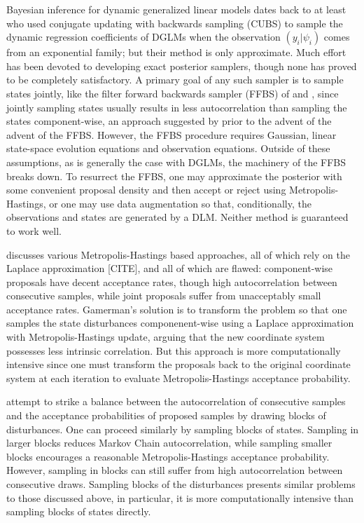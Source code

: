 \documentclass[11pt]{article}
\begin{document}
Bayesian inference for dynamic generalized linear models dates back to at least
\cite{west-etal-1985} who used conjugate updating with backwards sampling (CUBS)
to sample the dynamic regression coefficients of DGLMs when the observation
$(y_i | \psi_i)$ comes from an exponential family; but their method is only
approximate.  Much effort has been devoted to developing exact posterior
samplers, though none has proved to be completely satisfactory.  A primary goal
of any such sampler is to sample states jointly, like the filter forward
backwards sampler (FFBS) of \cite{fruhwirth-schnatter-1994} and
\cite{carter-kohn-1994}, since jointly sampling states usually results in less
autocorrelation than sampling the states component-wise, an approach suggested
by \cite{carlin-etal-1992} prior to the advent of the advent of the FFBS.
However, the FFBS procedure requires Gaussian, linear state-space evolution
equations and observation equations.  Outside of these assumptions, as is
generally the case with DGLMs, the machinery of the FFBS breaks down.  To
resurrect the FFBS, one may approximate the posterior with some convenient
proposal density and then accept or reject using Metropolis-Hastings, or one may
use data augmentation so that, conditionally, the observations and states are
generated by a DLM.  Neither method is guaranteed to work well.

\cite{gamerman-1998} discusses various Metropolis-Hastings based approaches, all
of which rely on the Laplace approximation [CITE], and all of which are
flawed: component-wise proposals have decent acceptance rates, though
high autocorrelation between consecutive samples, while joint proposals suffer
from unacceptably small acceptance rates.  Gamerman's solution is to transform
the problem so that one samples the state disturbances componenent-wise using a
Laplace approximation with Metropolis-Hastings update, arguing that the new
coordinate system possesses less intrinsic correlation.  But this approach is
more computationally intensive since one must transform the proposals back to
the original coordinate system at each iteration to evaluate Metropolis-Hastings
acceptance probability.

\cite{shephard-pitt-1997} attempt to strike a balance between the
autocorrelation of consecutive samples and the acceptance probabilities of
proposed samples by drawing blocks of disturbances.  One can proceed similarly
by sampling blocks of states.  Sampling in larger blocks reduces Markov Chain
autocorrelation, while sampling smaller blocks encourages a reasonable
Metropolis-Hastings acceptance probability.  However, sampling in blocks can
still suffer from high autocorrelation between consecutive draws.  Sampling
blocks of the disturbances presents similar problems to those discussed above,
in particular, it is more computationally intensive than sampling blocks of
states directly.
\end{document}
